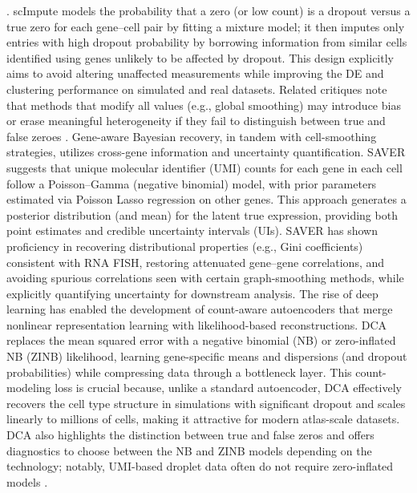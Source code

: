 \documentclass{article}
\theoremstyle{plain}
\theoremstyle{definition}
\theoremstyle{remark}
\begin{document}
\citep{Li2018scImpute,Malec2022ccImpute}. scImpute models the probability that a zero (or low count) is a dropout versus a true zero for each gene–cell pair by fitting a mixture model; it then imputes only entries with high dropout probability by borrowing information from similar cells identified using genes unlikely to be affected by dropout. This design explicitly aims to avoid altering unaffected measurements while improving the DE and clustering performance on simulated and real datasets. Related critiques note that methods that modify all values (e.g., global smoothing) may introduce bias or erase meaningful heterogeneity if they fail to distinguish between true and false zeroes \citep{Malec2022ccImpute,Jiang2022ZeroInflationReview}. Gene-aware Bayesian recovery, in tandem with cell-smoothing strategies, utilizes cross-gene information and uncertainty quantification. SAVER suggests that unique molecular identifier (UMI) counts for each gene in each cell follow a Poisson–Gamma (negative binomial) model, with prior parameters estimated via Poisson Lasso regression on other genes. This approach generates a posterior distribution (and mean) for the latent true expression, providing both point estimates and credible uncertainty intervals (UIs). SAVER has shown proficiency in recovering distributional properties (e.g., Gini coefficients) consistent with RNA FISH, restoring attenuated gene–gene correlations, and avoiding spurious correlations seen with certain graph-smoothing methods, while explicitly quantifying uncertainty for downstream analysis. The rise of deep learning has enabled the development of count-aware autoencoders that merge nonlinear representation learning with likelihood-based reconstructions. DCA replaces the mean squared error with a negative binomial (NB) or zero-inflated NB (ZINB) likelihood, learning gene-specific means and dispersions (and dropout probabilities) while compressing data through a bottleneck layer. This count-modeling loss is crucial because, unlike a standard autoencoder, DCA effectively recovers the cell type structure in simulations with significant dropout and scales linearly to millions of cells, making it attractive for modern atlas-scale datasets. DCA also highlights the distinction between true and false zeros and offers diagnostics to choose between the NB and ZINB models depending on the technology; notably, UMI-based droplet data often do not require zero-inflated models \citep{Eraslan2019DCA,Svensson2020NotZI}.  
\end{document}
